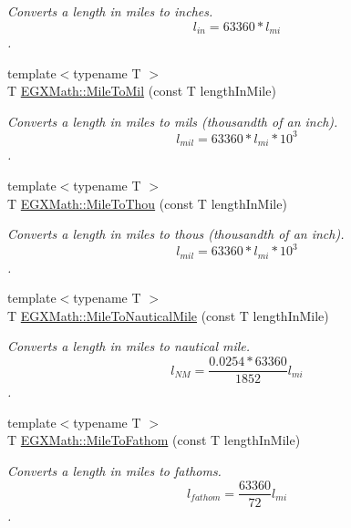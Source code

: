 \begin{DoxyCompactItemize}
\begin{DoxyCompactList}\small\item\em Converts a length in miles to inches. \[ l_{in}=63360 * l_{mi} \]. \end{DoxyCompactList}\item 
{\footnotesize template$<$typename T $>$ }\\T \mbox{\hyperlink{group___e_g_x_math-_conversions-_length_conversions-_imperial-_mile-_imperial_ga8f210f6be39b6ebd203e309b53556d22}{E\+G\+X\+Math\+::\+Mile\+To\+Mil}} (const T length\+In\+Mile)
\begin{DoxyCompactList}\small\item\em Converts a length in miles to mils (thousandth of an inch). \[ l_{mil}=63360 * l_{mi} * 10^{3} \]. \end{DoxyCompactList}\item 
{\footnotesize template$<$typename T $>$ }\\T \mbox{\hyperlink{group___e_g_x_math-_conversions-_length_conversions-_imperial-_mile-_imperial_gac5c37e3054c9b7817c9df5a348f8faf7}{E\+G\+X\+Math\+::\+Mile\+To\+Thou}} (const T length\+In\+Mile)
\begin{DoxyCompactList}\small\item\em Converts a length in miles to thous (thousandth of an inch). \[ l_{mil}=63360 * l_{mi} * 10^{3} \]. \end{DoxyCompactList}\item 
{\footnotesize template$<$typename T $>$ }\\T \mbox{\hyperlink{group___e_g_x_math-_conversions-_length_conversions-_imperial-_mile-_nautical_ga1f50d3e2d321bf020c3027501a2a5421}{E\+G\+X\+Math\+::\+Mile\+To\+Nautical\+Mile}} (const T length\+In\+Mile)
\begin{DoxyCompactList}\small\item\em Converts a length in miles to nautical mile. \[ l_{NM}= \frac{0.0254 * 63360}{1852} l_{mi} \]. \end{DoxyCompactList}\item 
{\footnotesize template$<$typename T $>$ }\\T \mbox{\hyperlink{group___e_g_x_math-_conversions-_length_conversions-_imperial-_mile-_nautical_gad8ee69c20f52894de8e71dd8c1eff9e7}{E\+G\+X\+Math\+::\+Mile\+To\+Fathom}} (const T length\+In\+Mile)
\begin{DoxyCompactList}\small\item\em Converts a length in miles to fathoms. \[ l_{fathom}= \frac{63360}{72} l_{mi} \]. \end{DoxyCompactList}\item 

\end{DoxyCompactItemize}
